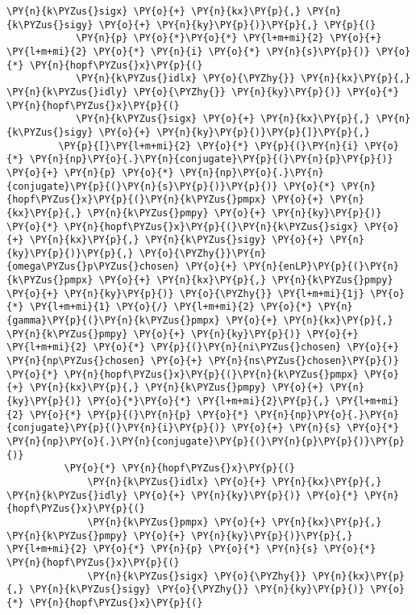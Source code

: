 \begin{Verbatim}[commandchars=\\\{\}]
            \PY{n}{k\PYZus{}sigx} \PY{o}{+} \PY{n}{kx}\PY{p}{,} \PY{n}{k\PYZus{}sigy} \PY{o}{+} \PY{n}{ky}\PY{p}{)}\PY{p}{,} \PY{p}{(}
            \PY{n}{p} \PY{o}{*}\PY{o}{*} \PY{l+m+mi}{2} \PY{o}{+} \PY{l+m+mi}{2} \PY{o}{*} \PY{n}{i} \PY{o}{*} \PY{n}{s}\PY{p}{)} \PY{o}{*} \PY{n}{hopf\PYZus{}x}\PY{p}{(}
            \PY{n}{k\PYZus{}idlx} \PY{o}{\PYZhy{}} \PY{n}{kx}\PY{p}{,} \PY{n}{k\PYZus{}idly} \PY{o}{\PYZhy{}} \PY{n}{ky}\PY{p}{)} \PY{o}{*} \PY{n}{hopf\PYZus{}x}\PY{p}{(}
            \PY{n}{k\PYZus{}sigx} \PY{o}{+} \PY{n}{kx}\PY{p}{,} \PY{n}{k\PYZus{}sigy} \PY{o}{+} \PY{n}{ky}\PY{p}{)}\PY{p}{]}\PY{p}{,}
         \PY{p}{[}\PY{l+m+mi}{2} \PY{o}{*} \PY{p}{(}\PY{n}{i} \PY{o}{*} \PY{n}{np}\PY{o}{.}\PY{n}{conjugate}\PY{p}{(}\PY{n}{p}\PY{p}{)} \PY{o}{+} \PY{n}{p} \PY{o}{*} \PY{n}{np}\PY{o}{.}\PY{n}{conjugate}\PY{p}{(}\PY{n}{s}\PY{p}{)}\PY{p}{)} \PY{o}{*} \PY{n}{hopf\PYZus{}x}\PY{p}{(}\PY{n}{k\PYZus{}pmpx} \PY{o}{+} \PY{n}{kx}\PY{p}{,} \PY{n}{k\PYZus{}pmpy} \PY{o}{+} \PY{n}{ky}\PY{p}{)} \PY{o}{*} \PY{n}{hopf\PYZus{}x}\PY{p}{(}\PY{n}{k\PYZus{}sigx} \PY{o}{+} \PY{n}{kx}\PY{p}{,} \PY{n}{k\PYZus{}sigy} \PY{o}{+} \PY{n}{ky}\PY{p}{)}\PY{p}{,} \PY{o}{\PYZhy{}}\PY{n}{omega\PYZus{}p\PYZus{}chosen} \PY{o}{+} \PY{n}{enLP}\PY{p}{(}\PY{n}{k\PYZus{}pmpx} \PY{o}{+} \PY{n}{kx}\PY{p}{,} \PY{n}{k\PYZus{}pmpy} \PY{o}{+} \PY{n}{ky}\PY{p}{)} \PY{o}{\PYZhy{}} \PY{l+m+mi}{1j} \PY{o}{*} \PY{l+m+mi}{1} \PY{o}{/} \PY{l+m+mi}{2} \PY{o}{*} \PY{n}{gamma}\PY{p}{(}\PY{n}{k\PYZus{}pmpx} \PY{o}{+} \PY{n}{kx}\PY{p}{,} \PY{n}{k\PYZus{}pmpy} \PY{o}{+} \PY{n}{ky}\PY{p}{)} \PY{o}{+} \PY{l+m+mi}{2} \PY{o}{*} \PY{p}{(}\PY{n}{ni\PYZus{}chosen} \PY{o}{+} \PY{n}{np\PYZus{}chosen} \PY{o}{+} \PY{n}{ns\PYZus{}chosen}\PY{p}{)} \PY{o}{*} \PY{n}{hopf\PYZus{}x}\PY{p}{(}\PY{n}{k\PYZus{}pmpx} \PY{o}{+} \PY{n}{kx}\PY{p}{,} \PY{n}{k\PYZus{}pmpy} \PY{o}{+} \PY{n}{ky}\PY{p}{)} \PY{o}{*}\PY{o}{*} \PY{l+m+mi}{2}\PY{p}{,} \PY{l+m+mi}{2} \PY{o}{*} \PY{p}{(}\PY{n}{p} \PY{o}{*} \PY{n}{np}\PY{o}{.}\PY{n}{conjugate}\PY{p}{(}\PY{n}{i}\PY{p}{)} \PY{o}{+} \PY{n}{s} \PY{o}{*} \PY{n}{np}\PY{o}{.}\PY{n}{conjugate}\PY{p}{(}\PY{n}{p}\PY{p}{)}\PY{p}{)}
          \PY{o}{*} \PY{n}{hopf\PYZus{}x}\PY{p}{(}
              \PY{n}{k\PYZus{}idlx} \PY{o}{+} \PY{n}{kx}\PY{p}{,} \PY{n}{k\PYZus{}idly} \PY{o}{+} \PY{n}{ky}\PY{p}{)} \PY{o}{*} \PY{n}{hopf\PYZus{}x}\PY{p}{(}
              \PY{n}{k\PYZus{}pmpx} \PY{o}{+} \PY{n}{kx}\PY{p}{,} \PY{n}{k\PYZus{}pmpy} \PY{o}{+} \PY{n}{ky}\PY{p}{)}\PY{p}{,} \PY{l+m+mi}{2} \PY{o}{*} \PY{n}{p} \PY{o}{*} \PY{n}{s} \PY{o}{*} \PY{n}{hopf\PYZus{}x}\PY{p}{(}
              \PY{n}{k\PYZus{}sigx} \PY{o}{\PYZhy{}} \PY{n}{kx}\PY{p}{,} \PY{n}{k\PYZus{}sigy} \PY{o}{\PYZhy{}} \PY{n}{ky}\PY{p}{)} \PY{o}{*} \PY{n}{hopf\PYZus{}x}\PY{p}{(}

\end{Verbatim}
